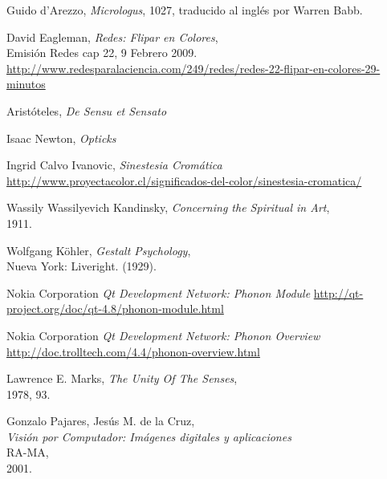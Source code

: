 \begin{thebibliography}{9}
 Guido d'Arezzo,
 \emph{Micrologus},
 1027,
 traducido al inglés por Warren Babb.

 David Eagleman,
 \emph{Redes: Flipar en Colores},\\
 Emisión Redes cap 22, 9 Febrero 2009.\\
 \url{http://www.redesparalaciencia.com/249/redes/redes-22-flipar-en-colores-29-minutos}

 Aristóteles,
 \emph{De Sensu et Sensato}

 Isaac Newton,
 \emph{Opticks}

 Ingrid Calvo Ivanovic,
 \emph{Sinestesia Cromática}
 \url{http://www.proyectacolor.cl/significados-del-color/sinestesia-cromatica/}

 Wassily Wassilyevich Kandinsky,
 \emph{Concerning the Spiritual in Art},\\
 1911.

 Wolfgang Köhler,
 \emph{Gestalt Psychology},\\
 Nueva York: Liveright. (1929).

 Nokia Corporation
 \emph{Qt Development Network: Phonon Module}
 \url{http://qt-project.org/doc/qt-4.8/phonon-module.html}
 
 Nokia Corporation
 \emph{Qt Development Network: Phonon Overview}
 \url{http://doc.trolltech.com/4.4/phonon-overview.html}

 Lawrence E. Marks,
 \emph{The Unity Of The Senses},\\
 1978, 93.

 Gonzalo Pajares, Jesús M. de la Cruz,\\
 \emph{Visión por Computador: Imágenes digitales y aplicaciones}\\
 RA-MA,\\
 2001.

\end{thebibliography}